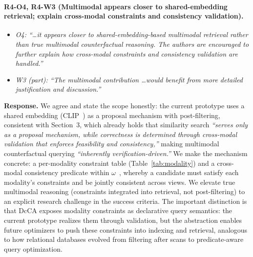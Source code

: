 \paragraph{R4-O4, R4-W3 (Multimodal appears closer to shared-embedding retrieval; explain cross-modal constraints and consistency validation).}

\begin{itemize}[leftmargin=1.2em, itemsep=1pt, topsep=2pt]
\item \textit{O4: ``\dots it appears closer to shared-embedding-based multimodal retrieval rather than true multimodal counterfactual reasoning. The authors are encouraged to further explain how cross-modal constraints and consistency validation are handled.''}
\item \textit{W3 (part): ``The multimodal contribution \dots would benefit from more detailed justification and discussion.''}
\end{itemize}
\smallskip

\noindent\textbf{Response.}
We agree and state the scope honestly: the current prototype uses a shared embedding (CLIP~\cite{radford2021learning}) as a proposal mechanism with post-filtering, consistent with Section~3, which already holds that similarity search \emph{``serves only as a proposal mechanism, while correctness is determined through cross-modal validation that enforces feasibility and consistency,''} making multimodal counterfactual querying \emph{``inherently verification-driven.''} We make the mechanism concrete: a per-modality constraint table (Table~\ref{tab:modality}) and a cross-modal consistency predicate within $\omega$~\cite{chen2019cross}, whereby a candidate must satisfy each modality's constraints and be jointly consistent across views. We elevate true multimodal reasoning (constraints integrated into retrieval, not post-filtering) to an explicit research challenge in the success criteria. The important distinction is that DcCA exposes modality constraints as declarative query semantics: the current prototype realizes them through validation, but the abstraction enables future optimizers to push these constraints into indexing and retrieval, analogous to how relational databases evolved from filtering after scans to predicate-aware query optimization.

